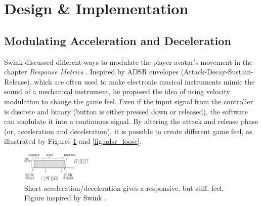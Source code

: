 \section{Design \& Implementation} \label{design}
\subsection{Modulating Acceleration and Deceleration}
Swink discussed different ways to modulate the player avatar's movement in the chapter \textit{Response Metrics} \cite{swink}. Inspired by ADSR envelopes (Attack-Decay-Sustain-Release), which are often used to make electronic musical instruments mimic the sound of a mechanical instrument, he proposed the idea of using velocity modulation to change the game feel. Even if the input signal from the controller is discrete and binary (button is either pressed down or released), the software can modulate it into a continuous signal. By altering the attack and release phase (or, acceleration and deceleration), it is possible to create different game feel, as illustrated by Figures \ref{fig:adsr_stiff} and \ref{fig:adsr_loose}.





\begin{figure}[htbp]
\centering
\includegraphics[width=0.30\textwidth]{Pics/adsr_stiff}
\caption{Short acceleration/deceleration gives a responsive, but stiff, feel. Figure inspired by Swink \cite{swink}.}
\label{fig:adsr_stiff}
\end{figure}

